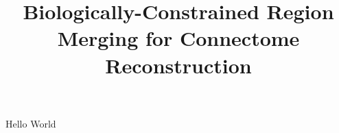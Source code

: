 \documentclass[runningheads]{llncs}
\begin{document}
\pagestyle{headings}
\mainmatter


\title{Biologically-Constrained Region Merging for Connectome Reconstruction}


\newcommand\TODO[1]{\textcolor{red}{#1}}

\maketitle

Hello World
	


\end{document}
